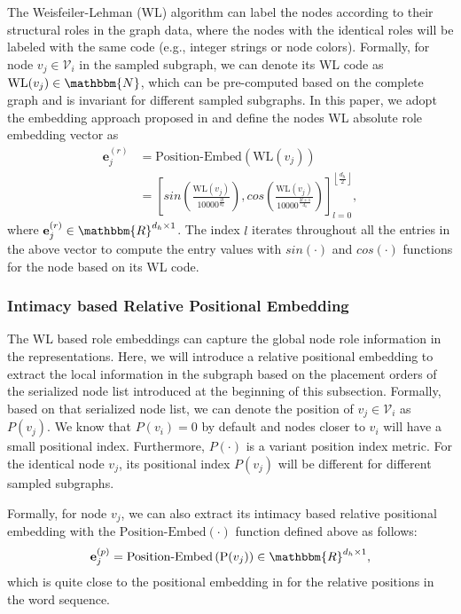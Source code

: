 \documentclass{article}
\newcommand{\mb}{\mathbf}
\newcommand{\mc}{\mathcal}
\begin{document}
The Weisfeiler-Lehman (WL) algorithm \cite{DBLP:journals/corr/NiepertAK16} can label the nodes according to their structural roles in the graph data, where the nodes with the identical roles will be labeled with the same code (e.g., integer strings or node colors). Formally, for node $v_j \in \mc{V}_i$ in the sampled subgraph, we can denote its WL code as $\mbox{WL}(v_j) \in \mathbbm{N}$, which can be pre-computed based on the complete graph and is invariant for different sampled subgraphs. In this paper, we adopt the embedding approach proposed in \cite{VSPUJGKP17} and define the nodes WL absolute role embedding vector as
\begin{equation}
\begin{aligned}
{\mb{e}}_{j}^{(r)}& = \mbox{Position-Embed} \left( \mbox{WL}(v_j) \right)\\
&=  \left[sin\left (\frac{\mbox{WL}(v_j)}{10000^{\frac{2 l}{d_{h}}}} \right), cos\left(\frac{\mbox{WL}(v_j)}{10000^{\frac{2 l + 1}{d_{h}}}} \right) \right]_{l=0}^{\left \lfloor \frac{d_h}{2} \right \rfloor},
\end{aligned}
\end{equation}
where ${\mb{e}}_{j}^{(r)} \in \mathbbm{R}^{d_h \times 1}$. The index $l$ iterates throughout all the entries in the above vector to compute the entry values with $sin(\cdot)$ and $cos(\cdot)$ functions for the node based on its WL code.


\subsubsection{Intimacy based Relative Positional Embedding}

The WL based role embeddings can capture the global node role information in the representations. Here, we will introduce a relative positional embedding to extract the local information in the subgraph based on the placement orders of the serialized node list introduced at the beginning of this subsection. Formally, based on that serialized node list, we can denote the position of $v_j \in \mc{V}_i$ as $P(v_j)$. We know that $P(v_i) = 0$ by default and nodes closer to $v_i$ will have a small positional index. Furthermore, $P(\cdot)$ is a variant position index metric. For the identical node $v_j$, its positional index $P(v_j)$ will be different for different sampled subgraphs.

Formally, for node $v_j$, we can also extract its intimacy based relative positional embedding with the $\mbox{Position-Embed}(\cdot)$ function defined above as follows:
\begin{equation}
{\mb{e}}_{j}^{(p)} = \mbox{Position-Embed} \left( \mbox{P}(v_j) \right) \in \mathbbm{R}^{d_h \times 1},
\end{equation}
which is quite close to the positional embedding in \cite{VSPUJGKP17} for the relative positions in the word sequence.
\end{document}
